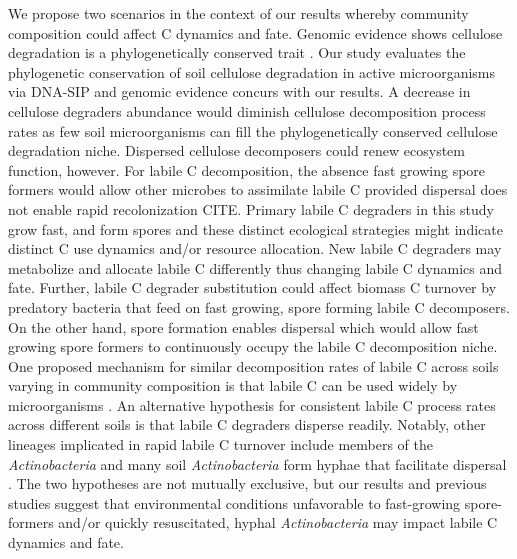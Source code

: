 We propose two scenarios in the context of our results whereby community
composition could affect C dynamics and fate. Genomic evidence shows cellulose
degradation is a phylogenetically conserved trait \citep{Berlemont2013}. Our
study evaluates the phylogenetic conservation of soil cellulose degradation in
active microorganisms via DNA-SIP and genomic evidence concurs with our
results. A decrease in cellulose degraders abundance would diminish cellulose
decomposition process rates as few soil microorganisms can fill the
phylogenetically conserved cellulose degradation niche. Dispersed cellulose
decomposers could renew ecosystem function, however. For labile
C decomposition, the absence fast growing spore formers would allow other
microbes to assimilate labile C provided dispersal does not enable rapid
recolonization CITE. Primary labile C degraders in this study grow fast, and
form spores and these distinct ecological strategies might indicate distinct
C use dynamics and/or resource allocation. New labile C degraders may
metabolize and allocate labile C differently thus changing labile C dynamics
and fate. Further, labile C degrader substitution could affect biomass
C turnover by predatory bacteria that feed on fast growing, spore forming
labile C decomposers. On the other hand, spore formation enables dispersal
\citep{Nicholson2000} which would allow fast growing spore formers to
continuously occupy the labile C decomposition niche. One proposed mechanism
for similar decomposition rates of labile C across soils varying in community
composition is that labile C can be used widely by microorganisms
\citep{McGuire2010}. An alternative hypothesis for consistent labile C process
rates across different soils is that labile C degraders disperse readily.
Notably, other lineages implicated in rapid labile C turnover include members
of the \textit{Actinobacteria} \citep{Placella2012} and many soil
\textit{Actinobacteria} form hyphae that facilitate dispersal
\citep{KILLHAM2007}. The two hypotheses are not mutually exclusive, but our
results and previous studies suggest that environmental conditions unfavorable
to fast-growing spore-formers and/or quickly resuscitated, hyphal
\textit{Actinobacteria} may impact labile C dynamics and fate.

